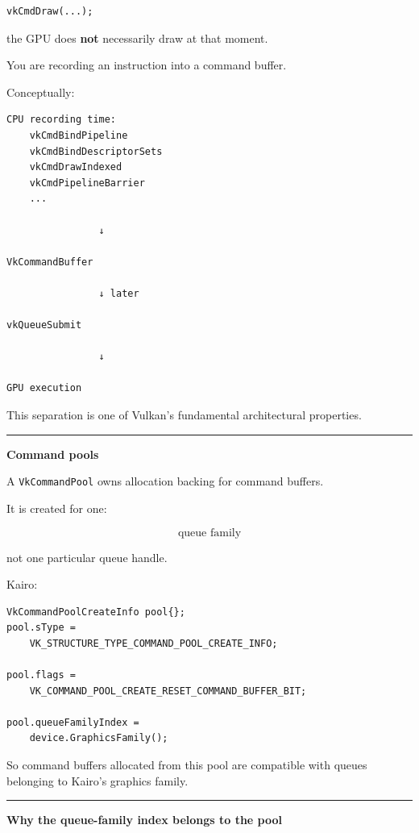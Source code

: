 \begin{verbatim}
vkCmdDraw(...);
\end{verbatim}

the GPU does \textbf{not} necessarily draw at that moment.

You are recording an instruction into a command buffer.

Conceptually:

\begin{verbatim}
CPU recording time:
    vkCmdBindPipeline
    vkCmdBindDescriptorSets
    vkCmdDrawIndexed
    vkCmdPipelineBarrier
    ...

                ↓

VkCommandBuffer

                ↓ later

vkQueueSubmit

                ↓

GPU execution
\end{verbatim}

This separation is one of Vulkan's fundamental architectural properties.

\begin{center}\rule{0.5\linewidth}{0.5pt}\end{center}

\textbf{Command pools}

A \texttt{VkCommandPool} owns allocation backing for command buffers.

It is created for one:

\[
\boxed{\text{queue family}}
\]

not one particular queue handle.

Kairo:

\begin{verbatim}
VkCommandPoolCreateInfo pool{};
pool.sType =
    VK_STRUCTURE_TYPE_COMMAND_POOL_CREATE_INFO;

pool.flags =
    VK_COMMAND_POOL_CREATE_RESET_COMMAND_BUFFER_BIT;

pool.queueFamilyIndex =
    device.GraphicsFamily();
\end{verbatim}

So command buffers allocated from this pool are compatible with queues belonging to Kairo's graphics family.

\begin{center}\rule{0.5\linewidth}{0.5pt}\end{center}

\textbf{Why the queue-family index belongs to the pool}

